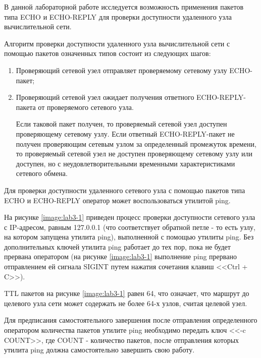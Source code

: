 	В данной лабораторной работе исследуется возможность применения пакетов типа ECHO и ECHO-REPLY для проверки доступности
	удаленного узла вычислительной сети.

	Алгоритм проверки доступности удаленного узла вычислительной сети с помощью пакетов означенных типов состоит из следующих шагов:

	\begin{enumerate}

		\item Проверяющий сетевой узел отправляет проверяемому сетевому узлу ECHO-пакет;
		\item Проверяющий сетевой узел ожидает получения ответного ECHO-REPLY-пакета от проверяемого сетевого узла.

		Если таковой пакет получен, то проверяемый сетевой узел доступен проверяющему сетевому узлу. Если ответный ECHO-REPLY-пакет не получен проверяющим
		сетевым узлом за определенный промежуток времени, то проверяемый сетевой узел не доступен проверяющему сетевому узлу
		или доступен, но с неудовлетворительными временными характеристиками сетевого обмена.

	\end{enumerate}

	Для проверки доступности удаленного сетевого узла с помощью пакетов типа ECHO и ECHO-REPLY оператор может воспользоваться утилитой ping.

	На рисунке \ref{image:lab3-1} приведен процесс проверки доступности сетевого узла с IP-адресом, равным 127.0.0.1 (что соответствует обратной петле -
	то есть узлу, на котором запущена утилита ping), выполненной с помощью утилиты ping. Без дополнительных ключей утилита ping работает до тех пор,
	пока не будет прервана оператором (на рисунке \ref{image:lab3-1} выполнение ping прервано отправлением ей сигнала SIGINT путем нажатия
	сочетания клавиш <<Ctrl + C>>).

	TTL пакетов на рисунке \ref{image:lab3-1} равен 64, что означает, что маршрут до целевого узла сети может содержать не более 64-х узлов, считая целевой узел.
			

	Для предписания самостоятельного завершения после отправления определенного оператором количества пакетов утилите ping необходимо передать
	ключ <<-c COUNT>>, где COUNT - количество пакетов, после отправления которых утилита ping должна самостоятельно завершить свою работу.


